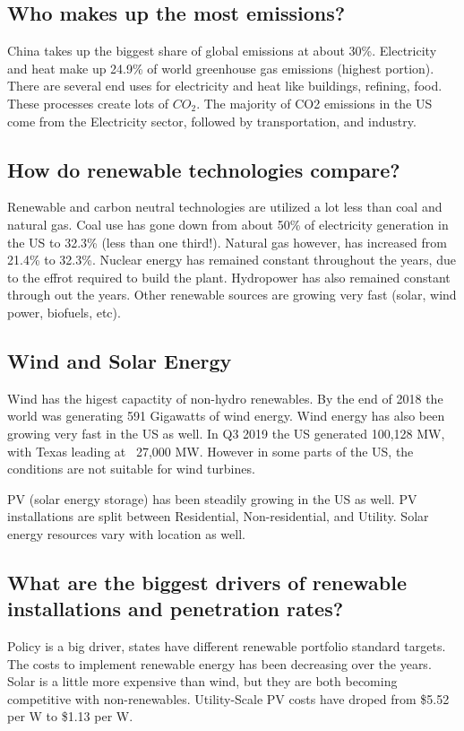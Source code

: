 \documentclass[12pt, a4paper]{report}
\begin{document}
  \subsection{Who makes up the most emissions?}

    China takes up the biggest share of global emissions at about 30\%. Electricity and heat make up 24.9\% of world greenhouse gas emissions (highest portion). There are several end uses for electricity and heat like buildings, refining, food. These processes create lots of $CO_2$. The majority of CO2 emissions in the US come from the Electricity sector, followed by transportation, and industry.

  \subsection{How do renewable technologies compare?}

    Renewable and carbon neutral technologies are utilized a lot less than coal and natural gas. Coal use has gone down from about 50\% of electricity generation in the US to 32.3\% (less than one third!). Natural gas however, has increased from 21.4\% to 32.3\%. Nuclear energy has remained constant throughout the years, due to the effrot required to build the plant. Hydropower has also remained constant through out the years. Other renewable sources are growing very fast (solar, wind power, biofuels, etc).

  \subsection{Wind and Solar Energy}

    Wind has the higest capactity of non-hydro renewables. By the end of 2018 the world was generating 591 Gigawatts of wind energy. Wind energy has also been growing very fast in the US as well. In Q3 2019 the US generated 100,128 MW, with Texas leading at ~27,000 MW. However in some parts of the US, the conditions are not suitable for wind turbines.

    PV (solar energy storage) has been steadily growing in the US as well. PV installations are split between Residential, Non-residential, and Utility. Solar energy resources vary with location as well.



  \subsection{What are the biggest drivers of renewable installations and penetration rates?}
    Policy is a big driver, states have different renewable portfolio standard targets. The costs to implement renewable energy has been decreasing over the years. Solar is a little more expensive than wind, but they are both becoming competitive with non-renewables. Utility-Scale PV costs have droped from \$5.52 per W to \$1.13 per W.
\end{document}
